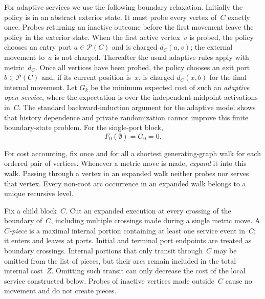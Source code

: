 \documentclass[12pt,a4paper,oneside]{report}
\begin{document}
For adaptive services we use the following boundary relaxation.  Initially
the policy is in an abstract exterior state.  It must probe every vertex of~$C$
exactly once.  Probes returning an inactive outcome before the first movement
leave the policy in the exterior state.  When the first active vertex~$v$ is probed, the policy
chooses an entry port $a\in\mathcal P(C)$ and is charged $d_C(a,v)$; the
external movement to~$a$ is not charged.  Thereafter the usual adaptive rules
apply with metric~$d_C$.  Once all vertices have been probed, the policy chooses
an exit port $b\in\mathcal P(C)$ and, if its current position is~$x$, is
charged $d_C(x,b)$ for the final internal movement.  Let $G_k$ be the minimum
expected cost of such an
\emph{adaptive open service}, where the expectation is over the independent
midpoint activations in~$C$.  The standard backward-induction argument for the adaptive model shows
that history dependence and private randomization
cannot improve this finite boundary-state problem.  For the single-port block,
\[
    F_0(\emptyset)=G_0=0.
\]

For cost accounting, fix once and for all a shortest generating-graph walk for
each ordered pair of vertices.  Whenever a metric move is made, \emph{expand}
it into this walk.  Passing through a vertex in an expanded walk neither probes
nor serves that vertex.  Every non-root arc occurrence in an expanded walk
belongs to a unique recursive level.

Fix a child block~$C$.  Cut an expanded execution at every crossing of the
boundary of~$C$, including multiple crossings made during a single metric
move.  A \emph{$C$-piece} is a maximal internal portion containing at least
one service event in~$C$; it enters and leaves at ports.  Initial and terminal
port endpoints are treated as boundary crossings.  Internal portions that
only transit through~$C$ may be omitted from the list of pieces, but their
arcs remain included in the total internal cost~$Z$.  Omitting such transit
can only decrease the cost of the local service constructed below.  Probes of
inactive vertices made outside~$C$ cause no movement and do not create pieces.
\end{document}
